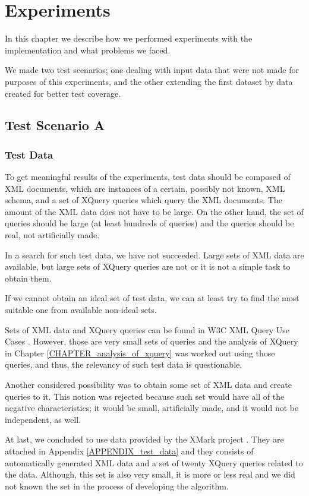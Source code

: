 \chapter{Experiments} \label{CHAPTER_experiments}
In this chapter we describe how we performed experiments with the implementation and what problems we faced.

We made two test scenarios; one dealing with input data that were not made for purposes of this experiments, and the other extending the first dataset by data created for better test coverage.

\section{Test Scenario A}

\subsection{Test Data}
To get meaningful results of the experiments, test data should be composed of XML documents, which are instances of a certain, possibly not known, XML schema, and a set of XQuery queries which query the XML documents. The amount of the XML data does not have to be large. On the other hand, the set of queries should be large (at least hundreds of queries) and the queries should be real, not artificially made.

In a search for such test data, we have not succeeded. Large sets of XML data are available, but large sets of XQuery queries are not or it is not a simple task to obtain them.

If we cannot obtain an ideal set of test data, we can at least try to find the most suitable one from available non-ideal sets.

Sets of XML data and XQuery queries can be found in W3C XML Query Use Cases \cite{Marchiori:07:XQU}. However, those are very small sets of queries and the analysis of XQuery in Chapter \ref{CHAPTER_analysis_of_xquery} was worked out using those queries, and thus, the relevancy of such test data is questionable.

Another considered possibility was to obtain some set of XML data and create queries to it. This notion was rejected because such set would have all of the negative characteristics; it would be small, artificially made, and it would not be independent, as well.

At last, we concluded to use data provided by the XMark project \cite{xmark}. They are attached in Appendix \ref{APPENDIX_test_data} and they consists of automatically generated XML data and a set of twenty XQuery queries related to the data. Although, this set is also very small, it is more or less real and we did not known the set in the process of developing the algorithm.

